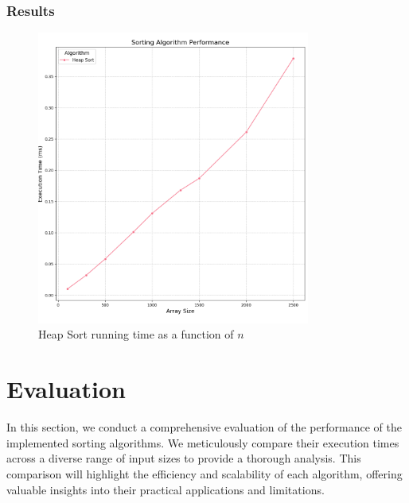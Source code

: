 \documentclass{article}
\begin{document}
\subsubsection{Results}
\begin{figure}[H]
	\includegraphics[width=0.8\textwidth]{images/heap_sort.png}
	\caption{Heap Sort running time as a function of $n$}
\end{figure}

\section{Evaluation}
In this section, we conduct a comprehensive evaluation of the performance of the implemented sorting algorithms. We meticulously compare their execution times across a diverse range of input sizes to provide a thorough analysis. This comparison will highlight the efficiency and scalability of each algorithm, offering valuable insights into their practical applications and limitations.
\end{document}
